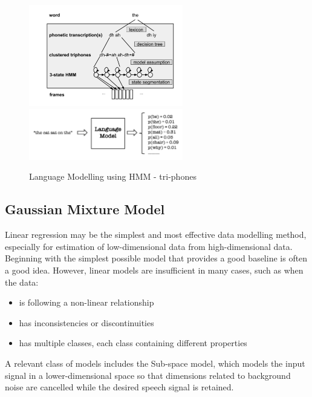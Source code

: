 \begin{figure}[h!]
    \centering
    \includegraphics[width=0.6\textwidth]{img/asr_17.png}
    \includegraphics[width=0.6\textwidth]{img/LM2.png}
    \caption{Language Modelling using HMM - tri-phones}
    \label{fig:lang-model2-tri-phones}
\end{figure}

\subsection{Gaussian Mixture Model}
\label{sub:GMM}

Linear regression may be the simplest and most effective data modelling method, especially for estimation of low-dimensional data from high-dimensional data. Beginning with the simplest possible model that provides a good baseline is often a good idea. However, linear models are insufficient in many cases, such as when the data:

\begin{itemize}
    \item is following a non-linear relationship
    \item has inconsistencies or discontinuities 
    \item has multiple classes, each class containing different properties 
\end{itemize}

A relevant class of models includes the Sub-space model, which models the input signal in a lower-dimensional space so that dimensions related to background noise are cancelled while the desired speech signal is retained.


